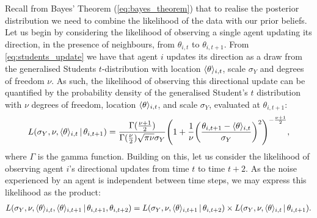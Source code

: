 Recall from Bayes' Theorem (\cref{eq:bayes_theorem}) that to realise the
posterior distribution we need to combine the likelihood of the data with our
prior beliefs. Let us begin by considering the likelihood of observing a single
agent updating its direction, in the presence of neighbours, from $\theta_{i,
t}$ to $\theta_{i, t+1}$. From \cref{eq:students_update} we have that agent $i$
updates its direction as a draw from the generalised Students $t$-distribution
with location $\langle\theta\rangle_{i,t}$, scale $\sigma_Y$ and degrees of freedom
$\nu$. As such, the likelihood of observing this directional update can be
quantified by the probability density of the generalised Student's $t$
distribution with $\nu$ degrees of freedom, location $\langle\theta\rangle_{i,t}$,
and scale $\sigma_Y$, evaluated at $\theta_{i,t+1}$:
\begin{equation*}
  L(\sigma_Y, \nu, \langle\theta\rangle_{i,t} \,|\, \theta_{i,t+1}) =
  \frac{\Gamma(\frac{\nu +1 }{2})}{\Gamma(\frac{\nu}{2})\sqrt{\pi\nu}\sigma_Y}
  \Bigg(1 + \frac{1}{\nu}
  \bigg(\frac{\theta_{i,t+1}-\langle\theta\rangle_{i,t}}{\sigma_Y}\bigg)^2
  \Bigg)^{-\frac{\nu+1}{2}},
\end{equation*}
where $\Gamma$ is the gamma function. Building on this, let us consider the
likelihood of observing agent $i$'s directional updates from time $t$ to time
$t+2$. As the noise experienced by an agent is independent between time steps,
we may express this likelihood as the product:
\begin{align*}
  L(\sigma_Y,\nu,\langle\theta\rangle_{i,t},\langle\theta\rangle_{i,t+1}\,|\,\theta_{i,t+1},
  \theta_{i,t+2})
  = L(\sigma_Y,\nu,\langle\theta\rangle_{i,t+1}\,|\,\theta_{i,t+2})\times
  L(\sigma_Y,\nu,\langle\theta\rangle_{i,t}\,|\,\theta_{i,t+1}).
\end{align*}

